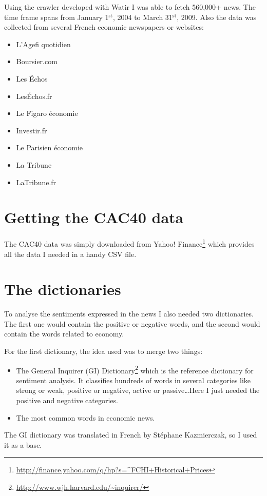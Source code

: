 \documentclass[12pt]{report}
\newcommand{\superscript}[1]{\ensuremath{^{\textrm{#1}}}}
\newcommand{\st}[0]{\superscript{st}}
\begin{document}
Using the crawler developed with Watir I was able to fetch 560,000+ news. The time frame spans from January 1\st, 2004 to March 31\st, 2009. Also the data was collected from several French economic newspapers or websites:
\begin{itemize}
	\item L'Agefi quotidien
	\item Boursier.com
	\item Les \'Echos
	\item Les\'Echos.fr
	\item Le Figaro économie
	\item Investir.fr
	\item Le Parisien économie
	\item La Tribune
	\item LaTribune.fr
\end{itemize}

\section{Getting the CAC40 data}

The CAC40 data was simply downloaded from Yahoo! Finance\footnote{\url{http://finance.yahoo.com/q/hp?s=^FCHI+Historical+Prices}} which provides all the data I needed in a handy  CSV file.

\section{The dictionaries}

To analyse the sentiments expressed in the news I also needed two dictionaries. The first one would contain the positive or negative words, and the second would contain the words related to economy.

For the first dictionary, the idea used was to merge two things:
\begin{itemize}
	\item The General Inquirer (GI) Dictionary\footnote{\url{http://www.wjh.harvard.edu/~inquirer/}} which is the reference dictionary for sentiment analysis. It classifies hundreds of words in several categories like strong or weak, positive or negative, active or passive\ldots Here I just needed the positive and negative categories.
	\item The most common words in economic news.
\end{itemize}

The GI dictionary was translated in French by Stéphane Kazmierczak, so I used it as a base.
\end{document}
